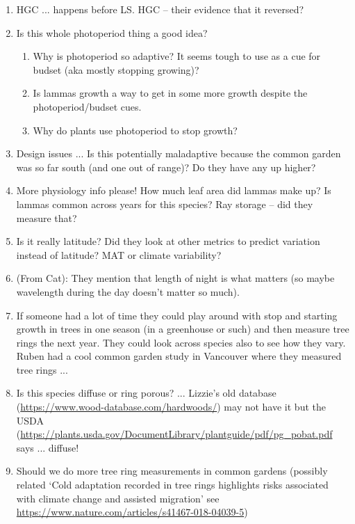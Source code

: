 \documentclass[11pt,letter]{article}
\begin{document}
\begin{enumerate}
\begin{enumerate}
\item HGC ... happens before LS. HGC -- their evidence that it reversed?
\item Is this whole photoperiod thing a good idea?
\begin{enumerate}
\item Why is photoperiod so adaptive? It seems tough to use as a cue for budset (aka mostly stopping growing)?
\item Is lammas growth a way to get in some more growth despite the photoperiod/budset cues. 
\item Why do plants use photoperiod to stop growth?
\end{enumerate}
\item Design issues ... Is this potentially maladaptive because the common garden was so far south (and one out of range)? Do they have any up higher?
\item More physiology info please! How much leaf area did lammas make up? Is lammas common across years for this species? Ray storage -- did they measure that?
\item Is it really latitude? Did they look at other metrics to predict variation instead of latitude? MAT or climate variability?
\item (From Cat): They mention that length of night is what matters (so maybe wavelength during the day doesn't matter so much).
\item If someone had a lot of time they could play around with stop and starting growth in trees in one season (in a greenhouse or such) and then measure tree rings the next year. They could look across species also to see how they vary. Ruben had a cool common garden study in Vancouver where they measured tree rings ... 
\item Is this species diffuse or ring porous?  ... Lizzie's old database (\url{https://www.wood-database.com/hardwoods/}) may not have it but the USDA (\url{https://plants.usda.gov/DocumentLibrary/plantguide/pdf/pg_pobat.pdf} says ... diffuse!
\item Should we do more tree ring measurements in common gardens (possibly related `Cold adaptation recorded in tree rings highlights risks associated with climate change and assisted migration' see \url{https://www.nature.com/articles/s41467-018-04039-5})

\end{enumerate}
\end{enumerate}
\end{document}
